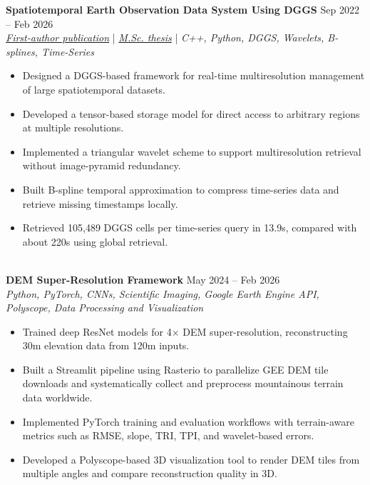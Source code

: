 \documentclass[a4paper,10pt]{article}
\begin{document}
\noindent
\textbf{Spatiotemporal Earth Observation Data System Using DGGS} \hfill Sep 2022 -- Feb 2026 \\
\textit{\href{https://doi.org/10.3390/rs17040570}{First-author publication}} | \textit{\href{https://ucalgary.scholaris.ca/items/114b394b-e516-4732-bd3a-45dd6160d480}{M.Sc. thesis}} | \textit{C++, Python, DGGS, Wavelets, B-splines, Time-Series}
\begin{itemize}[leftmargin=0.25in]
    \item Designed a DGGS-based framework for real-time multiresolution management of large spatiotemporal datasets.
    \item Developed a tensor-based storage model for direct access to arbitrary regions at multiple resolutions.
    \item Implemented a triangular wavelet scheme to support multiresolution retrieval without image-pyramid redundancy.
    \item Built B-spline temporal approximation to compress time-series data and retrieve missing timestamps locally.
    \item Retrieved 105,489 DGGS cells per time-series query in 13.9s, compared with about 220s using global retrieval.
\end{itemize}

\noindent \\
\textbf{DEM Super-Resolution Framework} \hfill May 2024 -- Feb 2026 \\
\textit{Python, PyTorch, CNNs, Scientific Imaging, Google Earth Engine API, Polyscope, Data Processing and Visualization}
\begin{itemize}[leftmargin=0.25in]
    \item Trained deep ResNet models for 4$\times$ DEM super-resolution, reconstructing 30m elevation data from 120m inputs.
    \item Built a Streamlit pipeline using Rasterio to parallelize GEE DEM tile downloads and systematically collect and preprocess mountainous terrain data worldwide.
    \item Implemented PyTorch training and evaluation workflows with terrain-aware metrics such as RMSE, slope, TRI, TPI, and wavelet-based errors.
    \item Developed a Polyscope-based 3D visualization tool to render DEM tiles from multiple angles and compare reconstruction quality in 3D.
\end{itemize}
\end{document}

